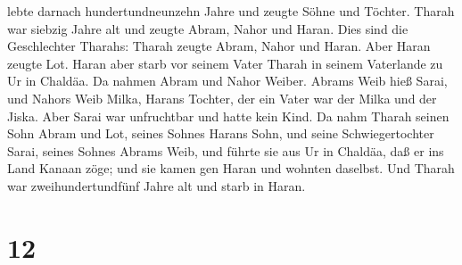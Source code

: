 lebte darnach hundertundneunzehn Jahre und zeugte Söhne und Töchter.
 Tharah war siebzig Jahre alt und zeugte Abram, Nahor und
Haran.  Dies sind die Geschlechter Tharahs: Tharah zeugte
Abram, Nahor und Haran. Aber Haran zeugte Lot.  Haran aber
starb vor seinem Vater Tharah in seinem Vaterlande zu Ur in Chaldäa.
 Da nahmen Abram und Nahor Weiber. Abrams Weib hieß Sarai,
und Nahors Weib Milka, Harans Tochter, der ein Vater war der Milka und
der Jiska.  Aber Sarai war unfruchtbar und hatte kein Kind.
 Da nahm Tharah seinen Sohn Abram und Lot, seines Sohnes
Harans Sohn, und seine Schwiegertochter Sarai, seines Sohnes Abrams
Weib, und führte sie aus Ur in Chaldäa, daß er ins Land Kanaan zöge; und
sie kamen gen Haran und wohnten daselbst.  Und Tharah war
zweihundertundfünf Jahre alt und starb in Haran.

\hypertarget{section-11}{%
\section{12}\label{section-11}}

